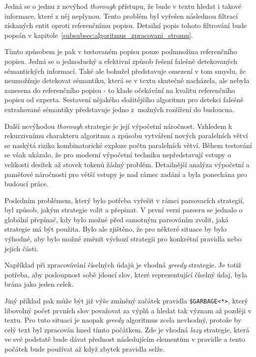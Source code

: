 Jedná se o jednu z nevýhod \emph{thorough} přístupu, že bude v textu hledat i takové informace, které z něj neplynou.
Tento problém byl vyřešen následnou filtrací získaných entit oproti referenčnímu popisu.
Detailní popis tohoto filtrování bude popsán v kapitole~\ref{subsubsec:algoritmus_zpracovani_stromu}.

Tímto způsobem je pak v testovaném popisu pouze podmnožina referenčního popisu.
Jedná se o jednoduchý a efektivní způsob řešení falešně detekovaných sémantických informací.
Také ale bohužel představuje omezení v tom smyslu, že neumožňuje detekovat sémantiku, která se v textu skutečně nacházela,
ale nebyla zanesena do referenčního popisu - to klade očekávání na kvalitu referenčního popisu od experta.
Sestavení nějakého složitějšího algoritmu pro detekci falešně extrahované sémantiky představuje jedno z~možných rozšíření do budoucna.

Další nevýhodou \emph{thorough} strategie je její výpočetní náročnost.
Vzhledem k rekurzivnímu charakteru algoritmu a způsobu vytváření nových paralelních větví
se naskýtá riziko kombinatorické exploze počtu paralelních větví.
Během testování se však ukázalo, že pro moderní výpočetní techniku nepředstavují vstupy o velikosti desítek až stovek tokenů žádný problém.
Detailnější analýza výpočetní a paměťové náročnosti pro větší vstupy je nad rámec zadání a byla ponechána pro budoucí práce.

Posledním problémem, který bylo potřeba vyřešit v rámci parsovacích strategií, byl způsob, jakým strategie volit a přepínat.
V první verzi parseru se jednalo o globální přepínač, kdy bylo možné před samotným parsováním zvolit, jaká strategie má být použita.
Bylo ale zjištěno, že pro některé situace by bylo výhodné, aby bylo možné změnit výchozí strategii pro konkrétní pravidla nebo jejich části.

Například při zpracovávání číselných údajů je vhodná \emph{greedy} strategie.
Je totiž potřeba, aby posloupnost sobě jdoucí slov, které reprezentující číselný údaj, byla brána jako jeden celek.

Jiný příklad pak může být již výše zmíněný začátek pravidla \texttt{\$GARBAGE<*>},
který libovolný počet prvních slov považovat za výplň a hledat tak význam až později v textu.
Pro tuto situaci je naopak \emph{greedy} algoritmus zcela nevhodný, protože by celý text byl zpracován hned tímto počátkem.
Zde je vhodná \emph{lazy} strategie, která ve své podstatě bude dávat přednost následujícím elementům
v pravidle a tento počátek bude používat až když zbytek pravidla selže.

